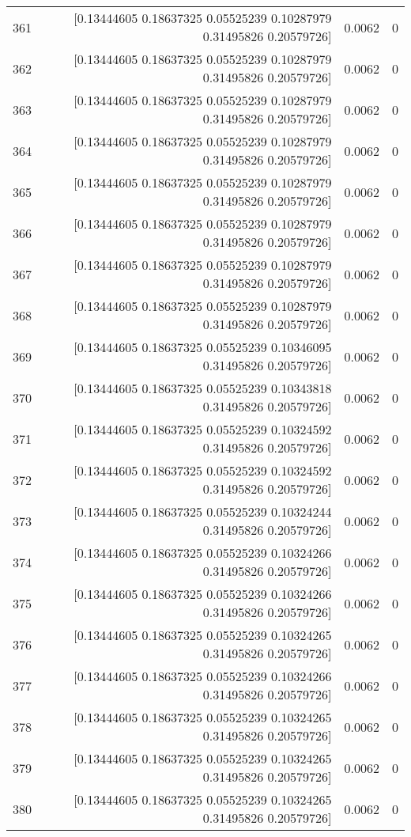 \begin{longtable}{lrrr}
361 & [0.13444605 0.18637325 0.05525239 0.10287979 0.31495826 0.20579726] & 0.0062 & 0 \\
362 & [0.13444605 0.18637325 0.05525239 0.10287979 0.31495826 0.20579726] & 0.0062 & 0 \\
363 & [0.13444605 0.18637325 0.05525239 0.10287979 0.31495826 0.20579726] & 0.0062 & 0 \\
364 & [0.13444605 0.18637325 0.05525239 0.10287979 0.31495826 0.20579726] & 0.0062 & 0 \\
365 & [0.13444605 0.18637325 0.05525239 0.10287979 0.31495826 0.20579726] & 0.0062 & 0 \\
366 & [0.13444605 0.18637325 0.05525239 0.10287979 0.31495826 0.20579726] & 0.0062 & 0 \\
367 & [0.13444605 0.18637325 0.05525239 0.10287979 0.31495826 0.20579726] & 0.0062 & 0 \\
368 & [0.13444605 0.18637325 0.05525239 0.10287979 0.31495826 0.20579726] & 0.0062 & 0 \\
369 & [0.13444605 0.18637325 0.05525239 0.10346095 0.31495826 0.20579726] & 0.0062 & 0 \\
370 & [0.13444605 0.18637325 0.05525239 0.10343818 0.31495826 0.20579726] & 0.0062 & 0 \\
371 & [0.13444605 0.18637325 0.05525239 0.10324592 0.31495826 0.20579726] & 0.0062 & 0 \\
372 & [0.13444605 0.18637325 0.05525239 0.10324592 0.31495826 0.20579726] & 0.0062 & 0 \\
373 & [0.13444605 0.18637325 0.05525239 0.10324244 0.31495826 0.20579726] & 0.0062 & 0 \\
374 & [0.13444605 0.18637325 0.05525239 0.10324266 0.31495826 0.20579726] & 0.0062 & 0 \\
375 & [0.13444605 0.18637325 0.05525239 0.10324266 0.31495826 0.20579726] & 0.0062 & 0 \\
376 & [0.13444605 0.18637325 0.05525239 0.10324265 0.31495826 0.20579726] & 0.0062 & 0 \\
377 & [0.13444605 0.18637325 0.05525239 0.10324266 0.31495826 0.20579726] & 0.0062 & 0 \\
378 & [0.13444605 0.18637325 0.05525239 0.10324265 0.31495826 0.20579726] & 0.0062 & 0 \\
379 & [0.13444605 0.18637325 0.05525239 0.10324265 0.31495826 0.20579726] & 0.0062 & 0 \\
380 & [0.13444605 0.18637325 0.05525239 0.10324265 0.31495826 0.20579726] & 0.0062 & 0 \\

\end{longtable}
